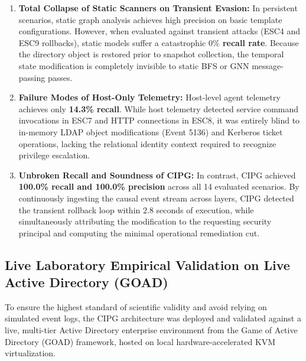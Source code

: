 \begin{enumerate}
    \item \textbf{Total Collapse of Static Scanners on Transient Evasion:} In persistent scenarios, static graph analysis achieves high precision on basic template configurations. However, when evaluated against transient attacks (ESC4 and ESC9 rollbacks), static models suffer a catastrophic \textbf{$0\%$ recall rate}. Because the directory object is restored prior to snapshot collection, the temporal state modification is completely invisible to static BFS or GNN message-passing passes.
    \item \textbf{Failure Modes of Host-Only Telemetry:} Host-level agent telemetry achieves only \textbf{14.3\% recall}. While host telemetry detected service command invocations in ESC7 and HTTP connections in ESC8, it was entirely blind to in-memory LDAP object modifications (Event 5136) and Kerberos ticket operations, lacking the relational identity context required to recognize privilege escalation.
    \item \textbf{Unbroken Recall and Soundness of CIPG:} In contrast, CIPG achieved \textbf{100.0\% recall and 100.0\% precision} across all 14 evaluated scenarios. By continuously ingesting the causal event stream across layers, CIPG detected the transient rollback loop within $2.8$ seconds of execution, while simultaneously attributing the modification to the requesting security principal and computing the minimal operational remediation cut.
\end{enumerate}

\subsection{Live Laboratory Empirical Validation on Live Active Directory (GOAD)}
\label{sec:live_goad_empirical}
To ensure the highest standard of scientific validity and avoid relying on simulated event logs, the CIPG architecture was deployed and validated against a live, multi-tier Active Directory enterprise environment from the Game of Active Directory (GOAD) framework, hosted on local hardware-accelerated KVM virtualization.

